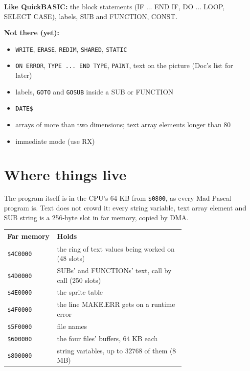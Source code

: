 \textbf{Like QuickBASIC:} the block statements (IF ... END IF, DO ... LOOP,
SELECT CASE), labels, SUB and FUNCTION, CONST.

\textbf{Not there (yet):}

\begin{itemize}
\item \verb|WRITE|, \verb|ERASE|, \verb|REDIM|, \verb|SHARED|, \verb|STATIC|
\item \texttt{ON ERROR}, \texttt{TYPE ... END TYPE}, \verb|PAINT|, text on the picture (Doc's list for later)
\item labels, \verb|GOTO| and \verb|GOSUB| inside a SUB or FUNCTION
\item \verb|DATE$|
\item arrays of more than two dimensions; text array elements longer than 80
\item immediate mode (use RX)
\end{itemize}

\section{Where things live}

The program itself is in the CPU's 64 KB from \verb|$0800|, as every Mad
Pascal program is. Text does not crowd it: every string variable, text
array element and SUB string is a 256-byte slot in far memory, copied by
DMA.

\begin{center}
\small
\begin{tabular}{@{}l >{\raggedright\arraybackslash}p{0.72\linewidth}@{}}
\toprule
\textbf{Far memory} & \textbf{Holds} \\
\midrule
\verb|$4C0000| & the ring of text values being worked on (48 slots) \\
\verb|$4D0000| & SUBs' and FUNCTIONs' text, call by call (250 slots) \\
\verb|$4E0000| & the sprite table \\
\verb|$4F0000| & the line MAKE.ERR gets on a runtime error \\
\verb|$5F0000| & file names \\
\verb|$600000| & the four files' buffers, 64 KB each \\
\verb|$800000| & string variables, up to 32768 of them (8 MB) \\
\bottomrule
\end{tabular}
\end{center}
